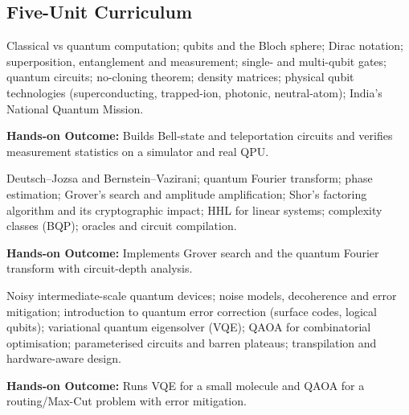 \documentclass[10pt,a4paper]{article}
\begin{document}
\subsection*{Five-Unit Curriculum}
\begin{tcolorbox}[unitbox,title={{\color{gold}UNIT I}\quad Quantum Computing Foundations\hfill{\color{gold}9 Hours}}]\small Classical vs quantum computation; qubits and the Bloch sphere; Dirac notation; superposition, entanglement and measurement; single- and multi-qubit gates; quantum circuits; no-cloning theorem; density matrices; physical qubit technologies (superconducting, trapped-ion, photonic, neutral-atom); India’s National Quantum Mission.\par\vspace{2pt}\par\textbf{Hands-on Outcome:} Builds Bell-state and teleportation circuits and verifies measurement statistics on a simulator and real QPU.\end{tcolorbox}
\begin{tcolorbox}[unitbox,title={{\color{gold}UNIT II}\quad Quantum Algorithms\hfill{\color{gold}9 Hours}}]\small Deutsch–Jozsa and Bernstein–Vazirani; quantum Fourier transform; phase estimation; Grover’s search and amplitude amplification; Shor’s factoring algorithm and its cryptographic impact; HHL for linear systems; complexity classes (BQP); oracles and circuit compilation.\par\vspace{2pt}\par\textbf{Hands-on Outcome:} Implements Grover search and the quantum Fourier transform with circuit-depth analysis.\end{tcolorbox}
\begin{tcolorbox}[unitbox,title={{\color{gold}UNIT III}\quad NISQ Computing and Variational Algorithms\hfill{\color{gold}9 Hours}}]\small Noisy intermediate-scale quantum devices; noise models, decoherence and error mitigation; introduction to quantum error correction (surface codes, logical qubits); variational quantum eigensolver (VQE); QAOA for combinatorial optimisation; parameterised circuits and barren plateaus; transpilation and hardware-aware design.\par\vspace{2pt}\par\textbf{Hands-on Outcome:} Runs VQE for a small molecule and QAOA for a routing/Max-Cut problem with error mitigation.\end{tcolorbox}
\end{document}
